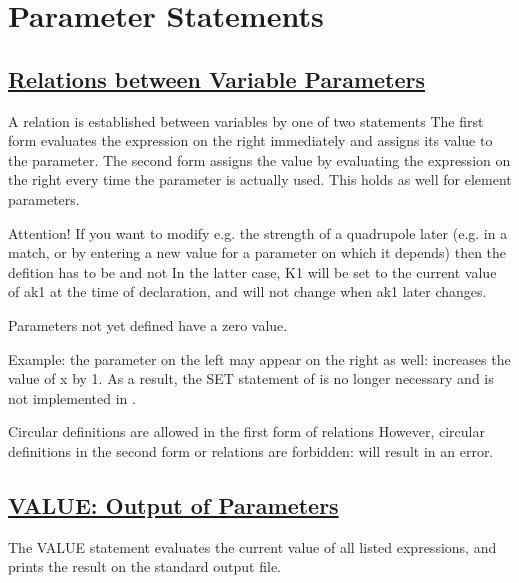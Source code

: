 

\chapter{Parameter Statements}
\label{chap:parameter}

\section{\href{relation}{Relations between Variable Parameters}}
 A relation is established between variables by one of two statements 
The first form evaluates the expression on the right immediately and
assigns its value to the parameter. The second form assigns the value by
evaluating  the expression on the right every time the parameter is actually
used. This holds as well for element parameters. 

Attention! If you want
to modify e.g. the strength of a quadrupole later (e.g. in a match,  or
by entering a new value for a parameter on which it depends) then the
defition has to be  
and not 
In the latter case, K1 will be set to the current value of ak1 at the
time of declaration, and will not change when ak1 later changes.  

Parameters not yet defined have a zero value.

Example: 
the parameter on the left may appear on the right as well: 
increases the value of x by 1. As a result, the SET statement of
\madeight is no longer necessary and is not implemented in \madx.  


Circular definitions are allowed in the first form of relations
However, circular definitions in the second form or relations are
forbidden: 
will result in an error.


\section{\href{par_output}{VALUE: Output of Parameters}}
The VALUE statement
evaluates the current value of all listed expressions, and
prints the result on the standard output file.

